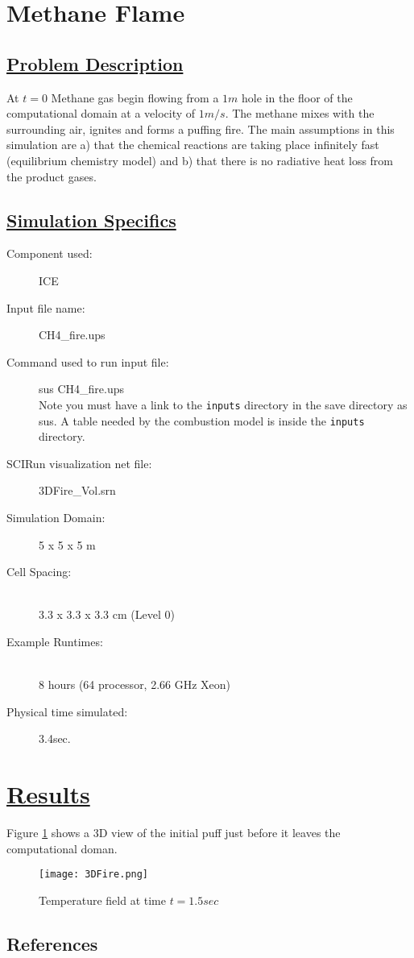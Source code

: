 
\section*{\center Methane Flame}
\subsection*{\underline{Problem Description}}
At $t=0$ Methane gas begin flowing from a $1m$ hole in the floor of the
computational domain at a velocity of $1m/s$.  The methane mixes with the
surrounding air, ignites and forms a puffing fire.  The main assumptions in
this simulation are a) that the chemical reactions are taking place infinitely
fast (equilibrium chemistry model) and b) that there is no radiative heat
loss from the product gases.
\subsection*{\underline{Simulation Specifics}}
\begin{description} 
\item [Component used:] \hfill ICE
\item [Input file name:] \hfill CH4\_fire.ups
\item [Command used to run input file:]\hfill sus CH4\_fire.ups \\
Note you must have a link to the {\tt inputs} directory in the save directory as sus.  A table needed
by the combustion model is inside the {\tt inputs} directory.
\item [SCIRun visualization net file:]\hfill 3DFire\_Vol.srn \\


\item [Simulation Domain:]\hfill    5 x 5 x 5 m
\item [Cell Spacing:]\hfill \\ 
3.3 x 3.3 x 3.3 cm (Level 0)


\item [Example Runtimes:] \hfill \\
 8 hours   (64 processor, 2.66 GHz Xeon)

\item [Physical time simulated:] \hfill 3.4sec.

\end{description}

\section*{\underline{Results}}
Figure \ref{results.CH4} shows a 3D view of the initial puff just before it leaves the computational
doman.  
\begin{figure}
\texttt{[image: 3DFire.png]}
\caption{Temperature field at time $t = 1.5 sec$}
\label{results.CH4}
\end{figure}
\newpage


\subsection{References}



